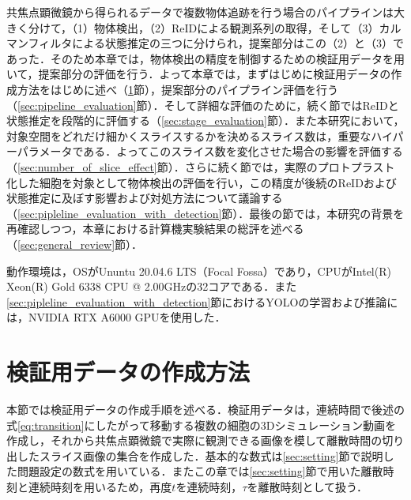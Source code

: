 \thispagestyle{fancy2}

共焦点顕微鏡から得られるデータで複数物体追跡を行う場合のパイプラインは大きく分けて，（1）物体検出，（2）ReIDによる観測系列の取得，そして（3）カルマンフィルタによる状態推定の三つに分けられ，提案部分はこの（2）と（3）であった．そのため本章では，物体検出の精度を制御するための検証用データを用いて，提案部分の評価を行う．よって本章では，まずはじめに検証用データの作成方法をはじめに述べ（\ref{sec:demodata}節），提案部分のパイプライン評価を行う（\ref{sec:pipeline_evaluation}節）．そして詳細な評価のために，続く節ではReIDと状態推定を段階的に評価する（\ref{sec:stage_evaluation}節）．また本研究において，対象空間をどれだけ細かくスライスするかを決めるスライス数は，重要なハイパーパラメータである．よってこのスライス数を変化させた場合の影響を評価する（\ref{sec:number_of_slice_effect}節）．さらに続く節では，実際のプロトプラスト化した細胞を対象として物体検出の評価を行い，この精度が後続のReIDおよび状態推定に及ぼす影響および対処方法について議論する（\ref{sec:pipleline_evaluation_with_detection}節）．最後の節では，本研究の背景を再確認しつつ，本章における計算機実験結果の総評を述べる（\ref{sec:general_review}節）．

動作環境は，OSがUnuntu 20.04.6 LTS（Focal Fossa）であり，CPUがIntel(R) Xeon(R) Gold 6338 CPU @ 2.00GHzの32コアである．また\ref{sec:pipleline_evaluation_with_detection}節におけるYOLOの学習および推論には，NVIDIA RTX A6000 GPUを使用した．

\section{検証用データの作成方法}
\label{sec:demodata}

本節では検証用データの作成手順を述べる．検証用データは，連続時間で後述の式\ref{eq:transition}にしたがって移動する複数の細胞の3Dシミュレーション動画を作成し，それから共焦点顕微鏡で実際に観測できる画像を模して離散時間の切り出したスライス画像の集合を作成した．基本的な数式は\ref{sec:setting}節で説明した問題設定の数式を用いている．またこの章では\ref{sec:setting}節で用いた離散時刻と連続時刻を用いるため，再度$t$を連続時刻，$\tau$を離散時刻として扱う．


